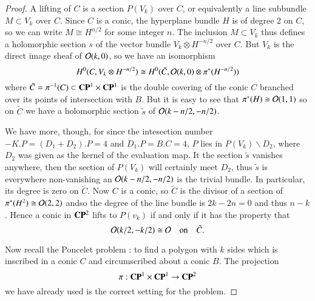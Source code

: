 \begin{proof}
A lifting of $C$ is a section $P(V_{k})$ over $C$, or equivalently a line subbundle $M\subset V_{k}$ over $C$. Since $C$ is a conic, the hyperplane bundle $H$ is of degree 2 on $C$, so we can write $M\cong H^{n/2}$ for some integer $n$. The inclusion $M\subset V_{k}$ thus defines a holomorphic section $s$ of the vector bundle $V_{k}\otimes H^{-n/2}$ over $C$. But $V_{k}$ is the direct image sheaf of $\mathcal{O}(k, 0)$, so we have an isomorphism
$$
H^{0}(C, V_{k}\otimes H^{-n/2}) \cong H^{0}(\tilde{C}, \mathcal{O}(k,0) \otimes \pi^{*}(H^{-n/2}))
$$
where $\tilde{C}= \pi^{-1}(C)\subset \mathbf{C}\mathbf{P}^{1} \times \mathbf{C}\mathbf{P}^{1}$ is the double covering of the conic $C$ branched over its points of intersection with $B$. But it is easy to see that $\pi^{*}(H)\cong\mathcal{O}(1,1)$ so on $\tilde{C}$ we have a holomorphic section $\tilde{s}$ of $\mathcal{O}(k-n/2, -n/2)$.

We have more, though, for since the intesection number$-K.P= (D_{1} + D_{2}). P =4$ and $D_{1}.P = B.C =4$, $P$ lies in $P(V_{k})\backslash D_{2}$, where $D_{2}$ was given as the kernel of the evaluation map. It the section $\tilde{s}$ vanishes anywhere, then the section of $P(V_{k})$ will certainly meet $D_{2}$, thus $\tilde{s}$ is everywhere non-vanishing an $\mathcal{O}(k-n/2, -n/2)$ is the trivial bundle. In particular, its degree is zero on $\tilde{C}$. Now $C$ is a conic, so $\tilde{C}$ is the divisor of a section of $\pi^{*}(H^{2}) \cong \mathcal{O} (2,2)$ and\pageoriginale so the degree of the line bundle is $2k-2n=0$ and thus $n-k$. Hence a conic in $\mathbf{C}\mathbf{P}^{2}$ lifts to $P(v_{k})$ if and only if it has the property that
$$
\mathcal{O}(k/2, -k/2)\cong \mathcal{O} \quad \text{on}\quad \tilde{C}.
$$

Now recall the Poncelet problem \cite{chap7-key3}: to find a polygon with $k$ sides which is inscribed in a conic $C$ and circumscribed about a conic $B$. The projection
$$
\pi: \mathbf{C}\mathbf{P}^{1}\times \mathbf{C}\mathbf{P}^{1} \rightarrow \mathbf{C}\mathbf{P}^{2}
$$
we have already used is the correct setting for the problem.


\end{proof}
